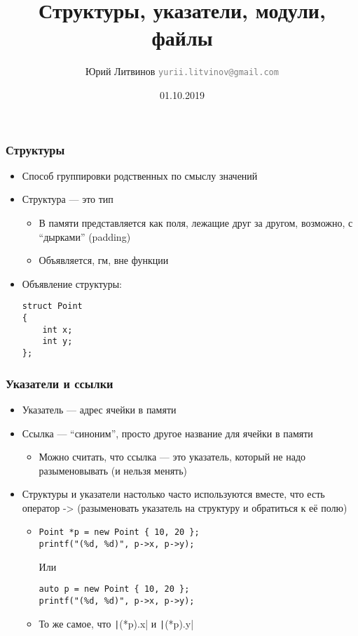 \documentclass[xetex,mathserif,serif]{beamer}
\title{Структуры, указатели, модули, файлы}
\author[Юрий Литвинов]{Юрий Литвинов \newline \textcolor{gray}{\small\texttt{yurii.litvinov@gmail.com}}}
\date{01.10.2019}
\begin{document}
	
	\frame{\titlepage}
	
	\begin{frame}[fragile]
		\frametitle{Структуры}
		\begin{itemize}
			\item Способ группировки родственных по смыслу значений
			\item Структура --- это тип
			\begin{itemize}
				\item В памяти представляется как поля, лежащие друг за другом, возможно, с ``дырками'' (padding)
				\item Объявляется, гм, вне функции
			\end{itemize}
			\item Объявление структуры:
			\begin{verbatim}
struct Point 
{
    int x;
    int y;
};
			\end{verbatim}
		\end{itemize}
	\end{frame}

	\begin{frame}[fragile]
		\frametitle{Указатели и ссылки}
		\begin{itemize}
			\item Указатель --- адрес ячейки в памяти
			\item Ссылка --- ``синоним'', просто другое название для ячейки в памяти
			\begin{itemize}
				\item Можно считать, что ссылка --- это указатель, который не надо разыменовывать (и нельзя менять)
			\end{itemize}
			\item Структуры и указатели настолько часто используются вместе, что есть оператор -> (разыменовать указатель на структуру и обратиться к её полю)
			\begin{itemize}
				\item 
				\begin{footnotesize}
					\begin{verbatim}
Point *p = new Point { 10, 20 };
printf("(%d, %d)", p->x, p->y);
					\end{verbatim}
					Или
					\begin{verbatim}
auto p = new Point { 10, 20 };
printf("(%d, %d)", p->x, p->y);
					\end{verbatim}
				\end{footnotesize}
				\item То же самое, что \texttt|(*p).x| и \texttt|(*p).y|
			\end{itemize}
		\end{itemize}
	\end{frame}
\end{document}

